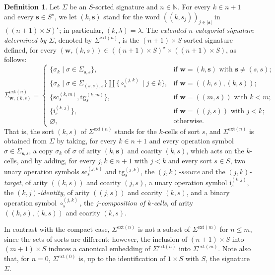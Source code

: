 \documentclass{amsart}
\theoremstyle{plain}
\theoremstyle{definition}
\newtheorem{definition}[theorem]{Definition}
\begin{document}
\begin{definition}\label{DSigmaCatExtended}
Let $\Sigma$ be an $S$-sorted signature and $n\in\mathbb{N}$. For every $k\in n+1$ and every $\mathbf{s}\in S^{\star}$, we let $(k,\mathbf{s})$ stand for the word $((k,s_{j}))_{j\in\lvert\mathbf{s}\rvert}$ in $((n+1)\times S)^{\star}$; in particular, $(k,\lambda)=\lambda$. The \emph{extended $n$-categorial signature determined by $\Sigma$}, denoted by $\Sigma^{\mathrm{ext}(n)}$, is the $(n+1)\times S$-sorted signature defined, for every $(\mathbf{w},(k,s))\in((n+1)\times S)^{\star}\times((n+1)\times S)$, as follows:
$$
{\Sigma}^{\mathrm{ext}(n)}_{\mathbf{w},(k,s)}=
\begin{cases}
\{\sigma_{k}\mid\sigma\in{\Sigma}_{\mathbf{s},s}\},
& \text{if $\mathbf{w}=(k,\mathbf{s})$ with $\mathbf{s}\neq(s,s)$;}\\
\{\sigma_{k}\mid\sigma\in{\Sigma}_{(s,s),s}\}\amalg\{\circ^{(j,k)}_{s}\mid j\in k\},
& \text{if $\mathbf{w}=((k,s),(k,s))$;}\\
\{\mathrm{sc}^{(k,m)}_{s}, \mathrm{tg}^{(k,m)}_{s}\},
& \text{if $\mathbf{w}=((m,s))$ with $k<m$;}\\
\{\mathrm{i}^{(k,j)}_{s}\},
& \text{if $\mathbf{w}=((j,s))$ with $j<k$;}\\
\varnothing,
& \text{otherwise.}
\end{cases}
$$
That is, the sort $(k,s)$ of ${\Sigma}^{\mathrm{ext}(n)}$ stands for the $k$-cells of sort $s$, and ${\Sigma}^{\mathrm{ext}(n)}$ is obtained from $\Sigma$ by taking, for every $k\in n+1$ and every operation symbol $\sigma\in\Sigma_{\mathbf{s},s}$, a copy $\sigma_{k}$ of $\sigma$ of arity $(k,\mathbf{s})$ and coarity $(k,s)$, which acts on the $k$-cells, and by adding, for every $j,k\in n+1$ with $j<k$ and every sort $s\in S$, two unary operation symbols $\mathrm{sc}^{(j,k)}_{s}$ and $\mathrm{tg}^{(j,k)}_{s}$, the \emph{$(j,k)$-source} and the \emph{$(j,k)$-target}, of arity $((k,s))$ and coarity $(j,s)$, a unary operation symbol $\mathrm{i}^{(k,j)}_{s}$, the \emph{$(k,j)$-identity}, of arity $((j,s))$ and coarity $(k,s)$, and a binary operation symbol $\circ^{(j,k)}_{s}$, the \emph{$j$-composition of $k$-cells}, of arity $((k,s),(k,s))$ and coarity $(k,s)$.
\end{definition}

In contrast with the compact case, $\Sigma^{\mathrm{ext}(n)}$ is not a subset of $\Sigma^{\mathrm{ext}(m)}$ for $n\leq m$, since the sets of sorts are different; however, the inclusion of $(n+1)\times S$ into $(m+1)\times S$ induces a canonical embedding of $\Sigma^{\mathrm{ext}(n)}$ into $\Sigma^{\mathrm{ext}(m)}$. Note also that, for $n=0$, $\Sigma^{\mathrm{ext}(0)}$ is, up to the identification of $1\times S$ with $S$, the signature $\Sigma$.
\end{document}
